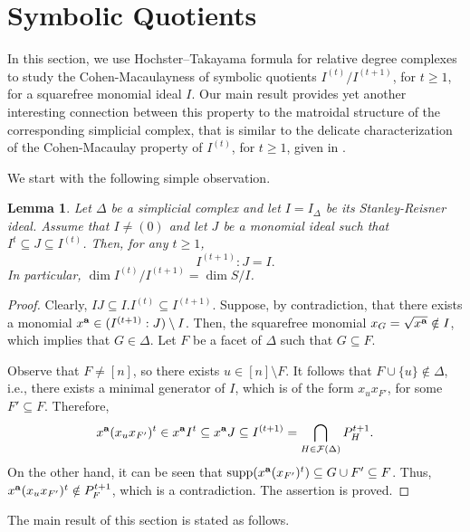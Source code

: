 \documentclass[12pt]{amsart}
\numberwithin{equation}{section}
\newtheorem{lemma}[theorem]{Lemma}
\theoremstyle{definition}
\theoremstyle{definition}
\DeclareMathOperator{\supp}{supp}
\def\a{{\bold a}}
\def\F{\mathcal{F}}
\begin{document}
\section{Symbolic Quotients} \label{sec.sym/sym}

In this section, we use Hochster--Takayama formula for relative degree complexes to study the Cohen-Macaulayness of symbolic quotients $I^{(t)}/I^{(t+1)}$, for $t \ge 1$, for a squarefree monomial ideal $I$. Our main result provides yet another interesting connection between this property to the matroidal structure of the corresponding simplicial complex, that is similar to the delicate characterization of the Cohen-Macaulay property of $I^{(t)}$, for $t \ge 1$, given in \cite{MT2011, V2011}.

We start with the following simple observation.

\begin{lemma}\label{dim-Key2}
	Let $\Delta$ be a simplicial complex and let $I=I_\Delta$ be its Stanley-Reisner ideal. Assume that $I \not= (0)$ and let $J$ be a monomial ideal such that $I^t \subseteq J \subseteq I^{(t)}$. Then, for any $t \ge 1$, 
	$$I^{(t+1)}:J=I.$$
	In particular, $\dim I^{(t)}/I^{(t+1)} = \dim S/I$.
\end{lemma}

\begin{proof} Clearly, $IJ\subseteq I.I^{(t)}\subseteq I^{(t+1)}$. Suppose, by contradiction, that there exists a monomial $x^\a\in(I^{(t+1)}:J)\setminus I$. Then, the squarefree monomial $x_G=\sqrt{x^\a}\notin I$, which implies that $G\in\Delta$. Let $F$ be a facet of $\Delta$ such that $G\subseteq F$. 
	
	Observe that $F\not= [n]$, so there exists $u\in [n]\setminus F$. It follows that $F\cup\{u\}\notin\Delta$, i.e., there exists a minimal generator of $I$, which is of the form $x_ux_{F'}$, for some $F'\subseteq F$. Therefore, 
	$$x^\a(x_ux_{F'})^t\in x^\a I^t\subseteq x^\a J\subseteq I^{(t+1)}=\bigcap_{H \in  \F(\Delta)} P_H^{t+1}.$$
	On the other hand, it can be seen that $\supp(x^\a(x_{F'})^t)\subseteq G\cup F'\subseteq F$. Thus, $x^\a(x_ux_{F'})^t \notin P_F^{t+1}$, which is a contradiction. The assertion is proved.
\end{proof}

The main result of this section is stated as follows. 
\end{document}
